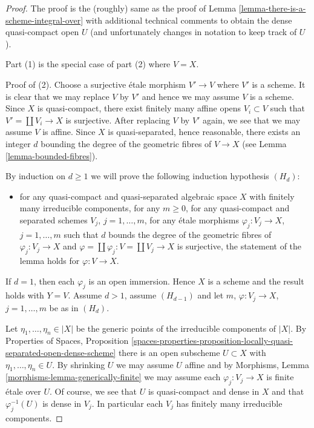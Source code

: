 \documentclass{stacks-project}
\theoremstyle{plain}
\theoremstyle{definition}
\theoremstyle{remark}
\numberwithin{equation}{subsection}
\begin{document}
\begin{proof}
The proof is the (roughly) same as the proof of
Lemma \ref{lemma-there-is-a-scheme-integral-over}
with additional technical comments to obtain
the dense quasi-compact open $U$ (and unfortunately
changes in notation to keep track of $U$).

\medskip\noindent
Part (1) is the special case of part (2) where $V = X$.

\medskip\noindent
Proof of (2). Choose a surjective \'etale morphism $V' \to V$
where $V'$ is a scheme. It is clear that we may replace $V$ by $V'$
and hence we may assume $V$ is a scheme. Since $X$ is quasi-compact,
there exist finitely many affine opens $V_i \subset V$ such that
$V' = \coprod V_i \to X$ is surjective.
After replacing $V$ by $V'$ again, we see that we may assume $V$ is affine.
Since $X$ is quasi-separated, hence reasonable, there exists an integer
$d$ bounding the degree of the geometric fibres of $V \to X$
(see Lemma \ref{lemma-bounded-fibres}).

\medskip\noindent
By induction on $d \geq 1$ we will prove the following induction
hypothesis $(H_d)$:
\begin{itemize}
\item for any quasi-compact and quasi-separated algebraic space
$X$ with finitely many irreducible components, for any $m \geq 0$,
for any quasi-compact and separated schemes $V_j$, $j = 1, \ldots, m$,
for any \'etale morphisms $\varphi_j : V_j \to X$, $j = 1, \ldots, m$
such that $d$ bounds the degree of the geometric fibres of
$\varphi_j : V_j\to X$ and
$\varphi = \coprod \varphi_j : V = \coprod V_j \to X$
is surjective, the statement of the lemma holds for $\varphi : V \to X$.
\end{itemize}
If $d = 1$, then each $\varphi_j$ is an open immersion. Hence $X$
is a scheme and the result holds with $Y = V$.
Assume $d > 1$, assume $(H_{d - 1})$ and let
$m$, $\varphi : V_j \to X$, $j = 1, \ldots, m$ be as in $(H_d)$.

\medskip\noindent
Let $\eta_1, \ldots, \eta_n \in |X|$ be the generic points of the
irreducible components of $|X|$. By
Properties of Spaces, Proposition
\ref{spaces-properties-proposition-locally-quasi-separated-open-dense-scheme}
there is an open subscheme $U \subset X$ with $\eta_1, \ldots, \eta_n \in U$.
By shrinking $U$ we may assume $U$ affine and by
Morphisms, Lemma \ref{morphisms-lemma-generically-finite}
we may assume each $\varphi_j : V_j \to X$ is finite \'etale over $U$.
Of course, we see that $U$ is quasi-compact and dense in $X$
and that $\varphi_j^{-1}(U)$ is dense in $V_j$. In particular each $V_j$
has finitely many irreducible components.


\end{proof}
\end{document}

